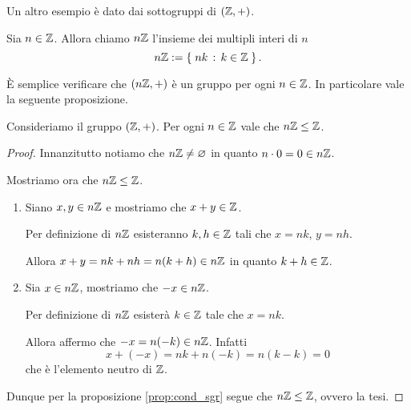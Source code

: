 Un altro esempio è dato dai sottogruppi di $(\mathbb{Z}, +)$.

\begin{definition}
    Sia $n \in \mathbb{Z}$. Allora chiamo $n\Z$ l'insieme dei multipli interi di $n$ \[
         n\mathbb{Z} := \left\{\;nk \,:\, k \in \mathbb{Z}\;\right\}.
    \]
\end{definition}

È semplice verificare che $(n\mathbb{Z}, +)$ è un gruppo per ogni $n \in \mathbb{Z}$. In particolare vale la seguente proposizione.

\begin{proposition}
    [$n\Z$ è sottogruppo di $\Z$] \label{prop:nZ_sgr_Z}
    Consideriamo il gruppo $(\mathbb{Z}, +)$.
    Per ogni $n \in \mathbb{Z}$ vale che $n\mathbb{Z} \leq \mathbb{Z}$.
\end{proposition}
\begin{proof}
    Innanzitutto notiamo che $n\mathbb{Z} \neq \varnothing$ in quanto $n \cdot 0 = 0 \in n\mathbb{Z}$. 
    
    Mostriamo ora che $n\mathbb{Z} \leq \mathbb{Z}$.
    \begin{enumerate}[label={(\arabic*)}]
        \item Siano $x, y \in n\mathbb{Z}$ e mostriamo che $x+y \in \mathbb{Z}$. 
        
        Per definizione di $n\Z$ esisteranno $k, h \in \mathbb{Z}$ tali che $x = nk$, $y = nh$.
        
        Allora $x + y = nk + nh = n(k + h) \in n\mathbb{Z}$ in quanto $k + h \in \mathbb{Z}$.
        \item Sia $x \in n\mathbb{Z}$, mostriamo che $-x \in n\mathbb{Z}$.
        
        Per definizione di $n\Z$ esisterà $k \in \mathbb{Z}$ tale che $x = nk$.

        Allora affermo che $-x = n(-k) \in n\mathbb{Z}$. Infatti \[
            x + (-x) = nk + n(-k) = n(k - k) = 0    
        \] che è l'elemento neutro di $\Z$.
    \end{enumerate}

    Dunque per la proposizione \ref{prop:cond_sgr} segue che $n\mathbb{Z} \leq \mathbb{Z}$, ovvero la tesi.
\end{proof}

